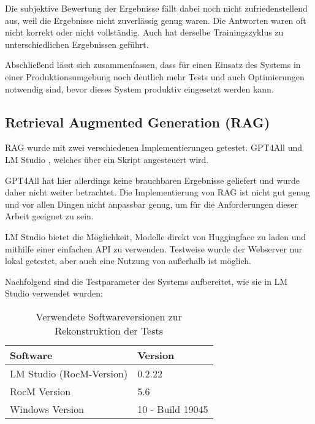 \documentclass[german,report]{i1thesis}
\begin{document}


Die subjektive Bewertung der Ergebnisse fällt dabei noch nicht zufriedenstellend aus, weil die Ergebnisse nicht zuverlässig genug waren.
Die Antworten waren oft nicht korrekt oder nicht vollständig.
Auch hat derselbe Trainingszyklus zu unterschiedlichen Ergebnissen geführt.

Abschließend lässt sich zusammenfassen, dass für einen Einsatz des Systems in einer Produktionsumgebung noch deutlich mehr Tests und auch Optimierungen notwendig sind, bevor dieses System produktiv eingesetzt werden kann.

\newpage
\subsection{Retrieval Augmented Generation (RAG)}%
\label{subsec:rag}


\ac{RAG} wurde mit zwei verschiedenen Implementierungen getestet.
GPT4All \autocite{gpt4all} und LM Studio \autocite{lmstudio}, welches über ein Skript angesteuert wird.

GPT4All hat hier allerdings keine brauchbaren Ergebnisse geliefert und wurde daher nicht weiter betrachtet.
Die Implementierung von \ac{RAG} ist nicht gut genug und vor allen Dingen nicht anpassbar genug, um für die Anforderungen dieser Arbeit geeignet zu sein.

LM Studio bietet die Möglichkeit, Modelle direkt von Huggingface zu laden und mithilfe einer einfachen \ac{API} zu verwenden.
Testweise wurde der Webserver nur lokal getestet, aber auch eine Nutzung von außerhalb ist möglich.

Nachfolgend sind die Testparameter des Systems aufbereitet, wie sie in LM Studio verwendet wurden:


\begin{table}[H]
    \centering
    \begin{tabular}{|l|l|}
        \hline
        \textbf{Software}        & \textbf{Version} \\ \hline
        LM Studio (RocM-Version) & 0.2.22           \\ \hline
        RocM Version             & 5.6              \\ \hline
        Windows Version          & 10 - Build 19045 \\ \hline
    \end{tabular}
    \caption{Verwendete Softwareversionen zur Rekonstruktion der Tests}
    \label{tab:software_versions}
\end{table}
\end{document}
